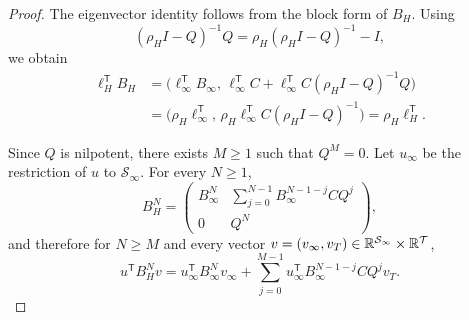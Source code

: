 \begin{proof}
The eigenvector identity follows from the block form of \(B_H\).  Using
\[
  (\rho_H I-Q)^{-1}Q=\rho_H(\rho_H I-Q)^{-1}-I,
\]
we obtain
\begin{align*}
  \ell_H^{\mathsf T}B_H
  &= \bigl(
       \ell_\infty^{\mathsf T}B_\infty,\,
       \ell_\infty^{\mathsf T}C
       + \ell_\infty^{\mathsf T}C(\rho_H I-Q)^{-1}Q
     \bigr) \\
  &= \bigl(
       \rho_H\ell_\infty^{\mathsf T},\,
       \rho_H\ell_\infty^{\mathsf T}C(\rho_H I-Q)^{-1}
     \bigr)
   = \rho_H\ell_H^{\mathsf T}.
\end{align*}

Since \(Q\) is nilpotent, there exists \(M\geq 1\) such that \(Q^M=0\).
Let \(u_\infty\) be the restriction of \(u\) to \(\mathcal S_\infty\).
For every \(N\geq 1\),
\[
  B_H^N=
  \begin{pmatrix}
    B_\infty^N &
    \sum_{j=0}^{N-1}B_\infty^{N-1-j}CQ^j\\
    0 & Q^N
  \end{pmatrix},
\]
and therefore for \(N\geq M\) and every vector
\(v=(v_\infty,v_T)\in\mathbb{R}^{\mathcal S_\infty}\times\mathbb{R}^{\mathcal T}\),
\[
  u^{\mathsf T}B_H^N v
  =
  u_\infty^{\mathsf T}B_\infty^N v_\infty
  + \sum_{j=0}^{M-1}
      u_\infty^{\mathsf T}B_\infty^{N-1-j}CQ^j v_T.
\]


\end{proof}
